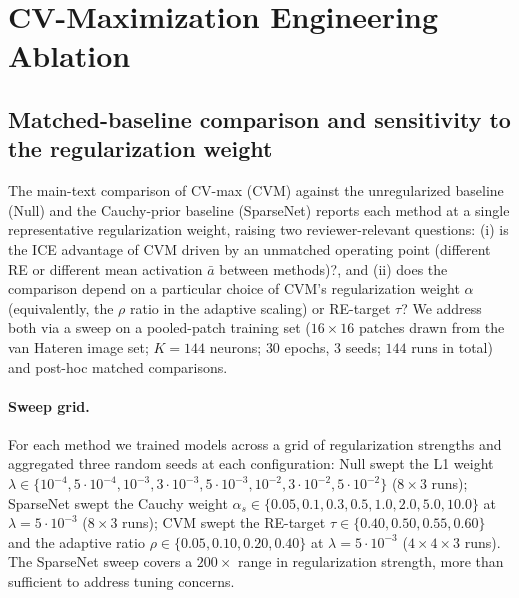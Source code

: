 \documentclass[11pt]{article}
\theoremstyle{remark}
\theoremstyle{definition}
\begin{document}
\newpage

\section{CV-Maximization Engineering Ablation}
\label{sec:cvm-engineering}

\subsection{Matched-baseline comparison and sensitivity to the regularization weight}
\label{sec:cvm-ablation}

The main-text comparison of CV-max (CVM) against the unregularized baseline (Null) and the Cauchy-prior baseline (SparseNet) reports each method at a single representative regularization weight, raising two reviewer-relevant questions: (i) is the ICE advantage of CVM driven by an unmatched operating point (different RE or different mean activation $\bar{a}$ between methods)?, and (ii) does the comparison depend on a particular choice of CVM's regularization weight $\alpha$ (equivalently, the $\rho$ ratio in the adaptive scaling) or RE-target $\tau$?  We address both via a sweep on a pooled-patch training set ($16\times 16$ patches drawn from the van Hateren image set; $K=144$ neurons; $30$ epochs, $3$ seeds; $144$ runs in total) and post-hoc matched comparisons.

\paragraph{Sweep grid.}
For each method we trained models across a grid of regularization strengths and aggregated three random seeds at each configuration: Null swept the L1 weight $\lambda\in\{10^{-4},5\!\cdot\!10^{-4},10^{-3},3\!\cdot\!10^{-3},5\!\cdot\!10^{-3},10^{-2},3\!\cdot\!10^{-2},5\!\cdot\!10^{-2}\}$ ($8\!\times\!3$ runs); SparseNet swept the Cauchy weight $\alpha_s\in\{0.05,0.1,0.3,0.5,1.0,2.0,5.0,10.0\}$ at $\lambda=5\!\cdot\!10^{-3}$ ($8\!\times\!3$ runs); CVM swept the RE-target $\tau\in\{0.40,0.50,0.55,0.60\}$ and the adaptive ratio $\rho\in\{0.05,0.10,0.20,0.40\}$ at $\lambda=5\!\cdot\!10^{-3}$ ($4\!\times\!4\!\times\!3$ runs).  The SparseNet sweep covers a $200\!\times$ range in regularization strength, more than sufficient to address tuning concerns.
\end{document}
